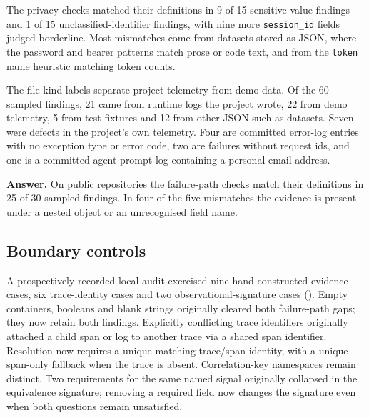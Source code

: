 \documentclass[conference]{IEEEtran}
\begin{document}
The privacy checks matched their definitions in 9 of 15 sensitive-value findings and 1 of 15 unclassified-identifier findings, with nine more \texttt{session\_id} fields judged borderline. Most mismatches come from datasets stored as JSON, where the password and bearer patterns match prose or code text, and from the \texttt{token} name heuristic matching token counts.

The file-kind labels separate project telemetry from demo data. Of the 60 sampled findings, 21 came from runtime logs the project wrote, 22 from demo telemetry, 5 from test fixtures and 12 from other JSON such as datasets. Seven were defects in the project's own telemetry. Four are committed error-log entries with no exception type or error code, two are failures without request ids, and one is a committed agent prompt log containing a personal email address.

\textbf{Answer.} On public repositories the failure-path checks match their definitions in 25 of 30 sampled findings. In four of the five mismatches the evidence is present under a nested object or an unrecognised field name.

\subsection{Boundary controls}
A prospectively recorded local audit exercised nine hand-constructed evidence cases, six trace-identity cases and two observational-signature cases (). Empty containers, booleans and blank strings originally cleared both failure-path gaps; they now retain both findings. Explicitly conflicting trace identifiers originally attached a child span or log to another trace via a shared span identifier. Resolution now requires a unique matching trace/span identity, with a unique span-only fallback when the trace is absent. Correlation-key namespaces remain distinct. Two requirements for the same named signal originally collapsed in the equivalence signature; removing a required field now changes the signature even when both questions remain unsatisfied.
\end{document}

